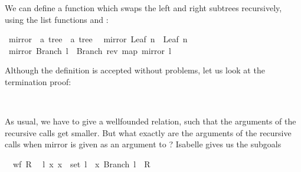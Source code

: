 \begin{isabellebody}
\begin{isamarkuptext}
\noindent We can define a function which swaps the left and right subtrees recursively, using the 
  list functions  and :%
\end{isamarkuptext}%
\isamarkuptrue%
\isamarkupfalse%
\ mirror\ {}{}\ {}{}a\ tree\ {}\ {}a\ tree{}\isanewline
{}\isanewline
\ \ {}mirror\ {}Leaf\ n{}\ {}\ Leaf\ n{}\isanewline
{}\ {}mirror\ {}Branch\ l{}\ {}\ Branch\ {}rev\ {}map\ mirror\ l{}{}{}%
\begin{isamarkuptext}%
Although the definition is accepted without problems, let us look at the termination proof:%
\end{isamarkuptext}%
\isamarkuptrue%
\isamarkupfalse%
%
\isadelimproof
\ %
\endisadelimproof
%
\isatagproof
{}\isamarkupfalse%
%
\begin{isamarkuptxt}%
As usual, we have to give a wellfounded relation, such that the
  arguments of the recursive calls get smaller. But what exactly are
  the arguments of the recursive calls when mirror is given as an
  argument to ? Isabelle gives us the
  subgoals

  \begin{isabelle}%
\ {}{}\ wf\ {}R\isanewline
\ {}{}\ {}l\ x{}\ x\ {}\ set\ l\ {}\ {}x{}\ Branch\ l{}\ {}\ {}R%
\end{isabelle} 


\end{isamarkuptxt}
\end{isabellebody}
